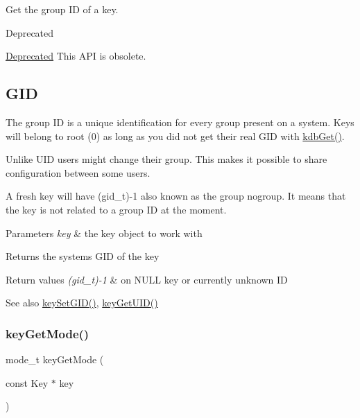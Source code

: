 Get the group ID of a key. 

\begin{DoxyRefDesc}{Deprecated}
\item[\hyperlink{deprecated__deprecated000015}{Deprecated}]This A\+PI is obsolete.\end{DoxyRefDesc}
\hypertarget{group__meta_GID}{}\subsection{G\+ID}\label{group__meta_GID}
The group ID is a unique identification for every group present on a system. Keys will belong to root (0) as long as you did not get their real G\+ID with \hyperlink{group__kdb_ga28e385fd9cb7ccfe0b2f1ed2f62453a1}{kdb\+Get()}.

Unlike U\+ID users might change their group. This makes it possible to share configuration between some users.

A fresh key will have (gid\+\_\+t)-\/1 also known as the group nogroup. It means that the key is not related to a group ID at the moment.


\begin{DoxyParams}{Parameters}
{\em key} & the key object to work with \\
\hline
\end{DoxyParams}
\begin{DoxyReturn}{Returns}
the system\textquotesingle{}s G\+ID of the key 
\end{DoxyReturn}

\begin{DoxyRetVals}{Return values}
{\em (gid\+\_\+t)-\/1} & on N\+U\+LL key or currently unknown ID \\
\hline
\end{DoxyRetVals}
\begin{DoxySeeAlso}{See also}
\hyperlink{group__meta_ga9e3d0fb3f7ba906e067727b9155d22e3}{key\+Set\+G\+I\+D()}, \hyperlink{group__meta_gacaa5060e67b03f50ae49a3620c54bc46}{key\+Get\+U\+I\+D()} 
\end{DoxySeeAlso}
\mbox{\label{group__meta_gabc0cec592ce3b77e9bc33dbc8e8f6bdc}} 
\subsubsection{\texorpdfstring{key\+Get\+Mode()}{keyGetMode()}}
{\footnotesize\ttfamily mode\+\_\+t key\+Get\+Mode (\begin{DoxyParamCaption}\item[{const Key $\ast$}]{key }\end{DoxyParamCaption})}



